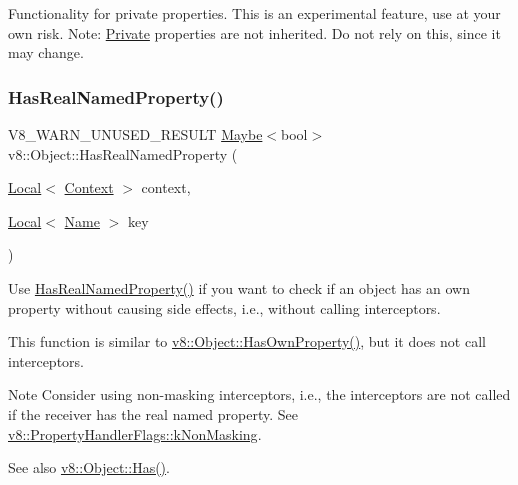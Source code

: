 Functionality for private properties. This is an experimental feature, use at your own risk. Note\+: \mbox{\hyperlink{classv8_1_1Private}{Private}} properties are not inherited. Do not rely on this, since it may change. \mbox{\label{classv8_1_1Object_ad830b937c7586fe2086b288ea79935c4}} 
\subsubsection{\texorpdfstring{Has\+Real\+Named\+Property()}{HasRealNamedProperty()}}
{\footnotesize\ttfamily V8\+\_\+\+W\+A\+R\+N\+\_\+\+U\+N\+U\+S\+E\+D\+\_\+\+R\+E\+S\+U\+LT \mbox{\hyperlink{classv8_1_1Maybe}{Maybe}}$<$bool$>$ v8\+::\+Object\+::\+Has\+Real\+Named\+Property (\begin{DoxyParamCaption}\item[{\mbox{\hyperlink{classv8_1_1Local}{Local}}$<$ \mbox{\hyperlink{classv8_1_1Context}{Context}} $>$}]{context,  }\item[{\mbox{\hyperlink{classv8_1_1Local}{Local}}$<$ \mbox{\hyperlink{classv8_1_1Name}{Name}} $>$}]{key }\end{DoxyParamCaption})}

Use \mbox{\hyperlink{classv8_1_1Object_ad830b937c7586fe2086b288ea79935c4}{Has\+Real\+Named\+Property()}} if you want to check if an object has an own property without causing side effects, i.\+e., without calling interceptors.

This function is similar to \mbox{\hyperlink{classv8_1_1Object_acdd3921e95d5bb1a27cea489792607ff}{v8\+::\+Object\+::\+Has\+Own\+Property()}}, but it does not call interceptors.

\begin{DoxyNote}{Note}
Consider using non-\/masking interceptors, i.\+e., the interceptors are not called if the receiver has the real named property. See {\ttfamily \mbox{\hyperlink{namespacev8_af4789f0aeb8680e353901a35810cac1aa8678eef5728c64ca2122dfe336f116aa}{v8\+::\+Property\+Handler\+Flags\+::k\+Non\+Masking}}}.
\end{DoxyNote}
See also \mbox{\hyperlink{classv8_1_1Object_a57d4819c2cc13715ed22dd23cdc84d7c}{v8\+::\+Object\+::\+Has()}}. \mbox{\label{classv8_1_1Object_aaec28576353eebe6fee113bce2718ecc}} 
